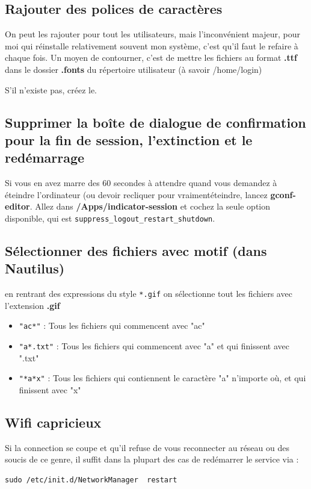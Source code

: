 \documentclass[a4paper,twoside]{article}
\begin{document}
\subsection{Rajouter des polices de caractères}
On peut les rajouter pour tout les utilisateurs, mais l'inconvénient majeur, pour moi qui réinstalle relativement souvent mon système, c'est qu'il faut le refaire à chaque fois. Un moyen de contourner, c'est de mettre les fichiers au format \textbf{.ttf} dans le dossier \textbf{.fonts} du répertoire utilisateur (à savoir /home/login)

\begin{remarque}
S'il n'existe pas, créez le.
\end{remarque}

\subsection{Supprimer la boîte de dialogue de confirmation pour la fin de session, l'extinction et le redémarrage}
Si vous en avez marre des 60 secondes à attendre quand vous demandez à éteindre l'ordinateur (ou devoir recliquer pour \og vraiment\fg éteindre, lancez \textbf{gconf-editor}. Allez dans \textbf{/Apps/indicator-session} et cochez la seule option disponible, qui est \texttt{suppress\_logout\_restart\_shutdown}.

\subsection{Sélectionner des fichiers avec motif (dans Nautilus)}
en rentrant des expressions du style \verb|*.gif| on sélectionne tout les fichiers avec l'extension \textbf{.gif}
\begin{itemize}
 \item \verb|"ac*"| : Tous les fichiers qui commencent avec "ac"
\item \verb|"a*.txt"| : Tous les fichiers qui commencent avec "a" et qui finissent avec ".txt"
\item \verb|"*a*x"| : Tous les fichiers qui contiennent le caractère "a" n'importe où, et qui finissent avec "x"
\end{itemize}

\subsection{Wifi capricieux}
Si la connection se coupe et qu'il refuse de vous reconnecter au réseau ou des soucis de ce genre, il suffit dans la plupart des cas de redémarrer le service via :
\begin{verbatim}
sudo /etc/init.d/NetworkManager  restart
\end{verbatim}
\end{document}
